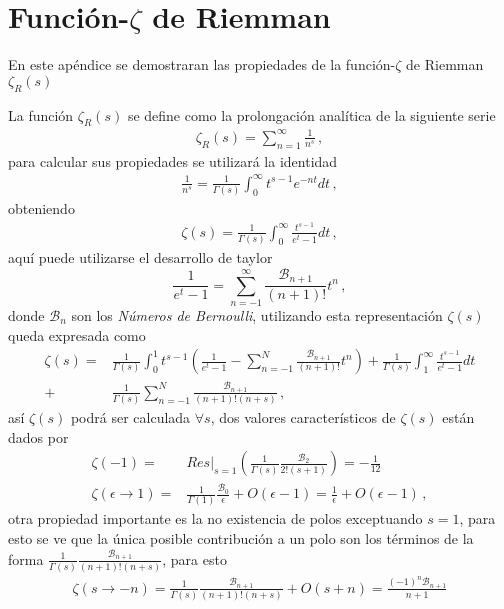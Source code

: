 \chapter{Función-\texorpdfstring{$\zeta$}{}  de Riemman} \label{Apendice.2}

En este apéndice se demostraran las propiedades de la función-$\zeta$ de Riemman $\zeta _R (s)$

La función $\zeta _R (s)$ se define como la prolongación analítica de la siguiente serie
\begin{align}
	\zeta _R (s) = 
	\sum _{n=1} ^{\infty} \frac{1}{n ^{s}}
	\, ,
\end{align}
para calcular sus propiedades se utilizará la identidad
\begin{align}
	\frac{1}{n ^{s}} =
	\frac{1}{\Gamma (s)} 
	\int _0 ^{\infty} t^{s-1} e ^{-n t}  dt
	\, ,
\end{align}
obteniendo
\begin{align}
	\zeta (s) = 
	\frac{1}{\Gamma (s)}
	\int _0 ^\infty
	\frac{t ^{s-1}}{e ^t -1} dt
	\, ,
\end{align}
aquí puede utilizarse el desarrollo de taylor 
\begin{equation}
	\frac{1}{e ^t -1} = 
	\sum _{n=-1} ^{\infty}
	\frac{ \mathcal{B} _{n+1}}{(n+1)!} t ^n
	\, ,
\end{equation}
donde $\mathcal{B} _{n}$ son los {\it Números de Bernoulli}, utilizando esta representación $\zeta (s)$ queda expresada como
\begin{align}
	\zeta (s) = 
&
	\frac{1}{\Gamma (s)}
	\int _0 ^1 
	t ^{s-1} 
	\left(	
		\frac{1}{e ^t -1} -
		\sum _{n=-1} ^{N}
		\frac{ \mathcal{B} _{n+1}}{(n+1)!} t ^n	
		\right)		
		+
	\frac{1}{\Gamma (s)}
	\int _1 ^\infty
	\frac{t ^{s-1}}{e ^t -1} dt
\\
	+
&
	\frac{1}{\Gamma (s)}
	\sum _{n=-1} ^{N}
	\frac{ \mathcal{B} _{n+1}}{ (n+1)! (n + s)}
	\, ,
\end{align}
así $\zeta (s)$ podrá ser calculada $\forall s $, dos valores característicos de $\zeta(s)$ están dados por
\begin{align}
	\zeta (-1) = 
&
	Res \Big| _{s=1}
		\left(
			\frac{1}{\Gamma (s)} \frac{\mathcal{B} _2}{2! (s+1)}
			\right) =
	- \frac{1}{12}
\\
	\zeta (\epsilon \rightarrow 1) =
& 
	\frac{1}{\Gamma (1)} \frac{\mathcal{B} _0}{ \epsilon} + O (\epsilon -1 ) = 
	\frac{1}{ \epsilon} + O (\epsilon -1 ) 
	\, ,
\end{align}
otra propiedad importante es la no existencia de polos exceptuando $s=1$, para esto se ve que la única posible contribución a un polo son los términos de la forma  $	\frac{1}{\Gamma (s)} \frac{ \mathcal{B} _{n+1}}{ (n+1)! (n + s)}$, para esto 
\begin{align}
	\zeta ( s \rightarrow -n ) = 
	\frac{1}{\Gamma (s)}
	\frac{ \mathcal{B} _{n+1}}{ (n+1)! (n + s)}
	+ O (s + n) = 
	\frac{(-1) ^n \mathcal{B} _{n+1}}
		{n+1}
\end{align}






















